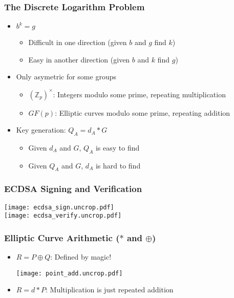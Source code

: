 \documentclass{beamer}
\begin{document}
\begin{frame}
  \frametitle{The Discrete Logarithm Problem}

  \begin{itemize}
  \item $b^k = g$
    \begin{itemize}
    \item Difficult in one direction (given $b$ and $g$ find $k$)
    \item Easy in another direction (given $b$ and $k$ find $g$)
    \end{itemize}
  \item Only asymetric for some groups
    \begin{itemize}
    \item $({\mathbb Z}_p)^\times$: Integers modulo some prime,
      repeating multiplication
    \item $GF(p)$: Elliptic curves modulo some prime, repeating
      addition
    \end{itemize}
  \item Key generation: $Q_A = d_A * G$
    \begin{itemize}
    \item Given $d_A$ and $G$, $Q_A$ is easy to find
    \item Given $Q_A$ and $G$, $d_A$ is hard to find
    \end{itemize}
  \end{itemize}
\end{frame}

\begin{frame}
  \frametitle{ECDSA Signing and Verification}

  \begin{center}
    \begin{multicols}{2}
      \texttt{[image: ecdsa\_sign.uncrop.pdf]} \\
      \texttt{[image: ecdsa\_verify.uncrop.pdf]} \\
    \end{multicols}
  \end{center}
\end{frame}

\begin{frame}
  \frametitle{Elliptic Curve Arithmetic ($*$ and $\oplus$)}

  \begin{itemize}
  \item $R = P\oplus Q$: Defined by magic!
    \begin{center}
      \texttt{[image: point\_add.uncrop.pdf]}
    \end{center}
  \item $R = d*P$: Multiplication is just repeated addition
  \end{itemize}
\end{frame}
\end{document}

